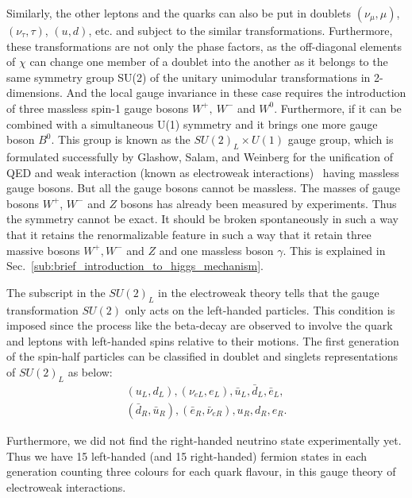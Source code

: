 


Similarly, the other leptons and the quarks can also be put in doublets $(\nu_\mu, \mu)$, $(\nu_\tau,\tau)$, $(u,d)$, etc. and subject to the similar transformations.
Furthermore, these transformations are not only the phase factors, as the off-diagonal elements of $\chi$ can change one member of a doublet into the another as it belongs to the same symmetry group SU(2) of the unitary unimodular transformations in 2-dimensions.
And the local gauge invariance in these case requires the introduction of three massless spin-1 gauge bosons $W^+,~W^-$ and $W^0$.
Furthermore, if it can be combined with a simultaneous U(1) symmetry and it brings one more gauge boson $B^0$. This group is known as the $SU(2)_L\times U(1)$ gauge group, which is formulated successfully by Glashow, Salam, and Weinberg for the unification of QED and weak interaction (known as electroweak interactions)~\cite{StandardModel67_2} having massless gauge bosons. But all the gauge bosons cannot be massless. The masses of gauge bosons $W^+$, $W^-$ and $Z$ bosons has already been measured by experiments. Thus the symmetry cannot be exact. It should be broken spontaneously in such a way that it retains the renormalizable feature in such a way that it retain three massive bosons $W^+, W^-$ and $Z$ and one massless boson $\gamma$. This is explained in Sec.~\ref{sub:brief_introduction_to_higgs_mechanism}.

The subscript in the $SU(2)_L$ in the electroweak theory tells that the gauge transformation $SU(2)$ only acts on the left-handed particles. This condition is imposed since the process like the beta-decay are observed to involve the quark and leptons with left-handed spins relative to their motions. The first generation of the spin-half particles can be classified in doublet and singlets representations of $SU(2)_L$ as below:
\begin{eqnarray}
    (u_L,d_L),(\nu_{eL},e_L),\bar{u}_L,\bar{d}_L,\bar{e}_L, \nonumber \\
    (\bar{d}_R,\bar{u}_R),(\bar{e}_R,\bar{\nu}_{eR}),u_R,d_R,e_R.   \nonumber
\end{eqnarray}

Furthermore, we did not find the right-handed neutrino state experimentally yet.
Thus we have 15 left-handed (and 15 right-handed) fermion states in each generation counting three colours for each quark flavour, in this gauge theory of electroweak interactions.

